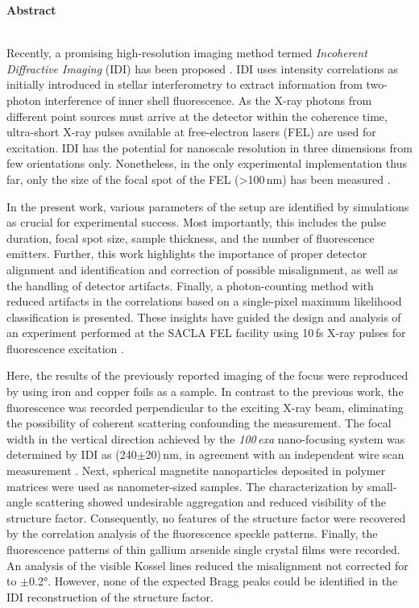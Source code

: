 	\begin{Huge}
		\textbf{Abstract}\vspace{12mm}
	\end{Huge}
\\
Recently, a promising high-resolution imaging method termed \textit{Incoherent Diffractive Imaging} (IDI) has been proposed \cite{classen2017}. IDI uses intensity correlations as initially introduced in stellar interferometry to extract information from two-photon interference of inner shell fluorescence. As the X-ray photons from different point sources must arrive at the detector within the coherence time, ultra-short X-ray pulses available at free-electron lasers (FEL) are used for excitation.   IDI has the potential for nanoscale resolution in three dimensions from few orientations only. Nonetheless, in the only experimental implementation thus far, only the size of the focal spot of the FEL (>100\,nm) has been measured \cite{nakumura2020}.

In the present work, various parameters of the setup are identified by simulations as crucial for experimental success. Most importantly, this includes the pulse duration, focal spot size,  sample thickness, and the number of fluorescence emitters. Further, this work highlights the importance of proper detector alignment and identification and correction of possible misalignment, as well as the handling of detector artifacts. Finally, a photon-counting method with reduced artifacts in the correlations based on a single-pixel maximum likelihood classification is presented. These insights have guided the design and analysis of an experiment performed at the SACLA FEL facility using 10\,fs X-ray pulses for fluorescence excitation \cite{yabashi2015}.

Here, the results of the previously reported imaging of the focus were reproduced by using iron and copper foils as a sample.  In contrast to the previous work, the fluorescence was recorded perpendicular to the exciting X-ray beam, eliminating the possibility of coherent scattering confounding the measurement. The focal width in the vertical direction achieved by the \textit{100\,exa} nano-focusing system was determined by IDI  as (240$\pm$20)\,nm, in agreement with an independent wire scan measurement \cite{yumoto2020}. Next, spherical magnetite nanoparticles deposited in polymer matrices were used as nanometer-sized samples. The characterization by small-angle scattering showed undesirable aggregation and reduced visibility of the structure factor. Consequently, no features of the structure factor were recovered by the correlation analysis of the fluorescence speckle patterns.  Finally, the fluorescence patterns of thin gallium arsenide single crystal films were recorded.  An analysis of the visible Kossel lines reduced the misalignment not corrected for to $\pm$0.2°. However, none of the expected Bragg peaks could be identified in the IDI reconstruction of the structure factor.

